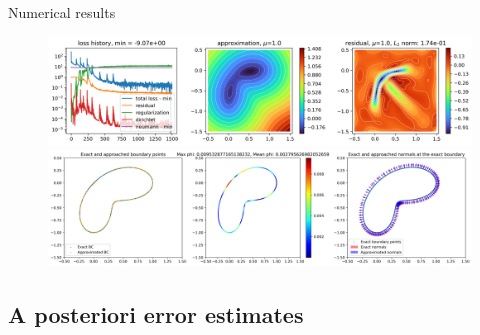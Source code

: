 \begin{frame}{Numerical results}		
    \begin{figure}[!ht] \centering
		\includegraphics[width=\linewidth]{images/newlines/levelset/EikonalBean_curvature.png}


		\includegraphics[width=\linewidth]{images/newlines/levelset/boundary_curvature.png}
	\end{figure}

\end{frame}

\subsection{\filledstar A posteriori error estimates}

